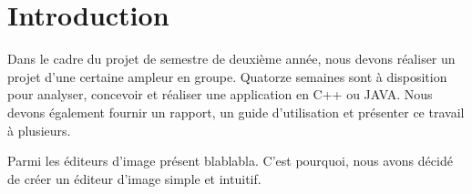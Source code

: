 \section{Introduction}

Dans le cadre du projet de semestre de deuxième année, nous devons réaliser un projet d'une certaine ampleur 
en groupe. Quatorze semaines sont à disposition pour analyser, concevoir et réaliser une application en C++ 
ou JAVA. Nous devons également fournir un rapport, un guide d'utilisation et présenter ce travail à plusieurs.

Parmi les éditeurs d'image présent blablabla. C'est pourquoi, nous avons décidé de créer un éditeur d'image
simple et intuitif.